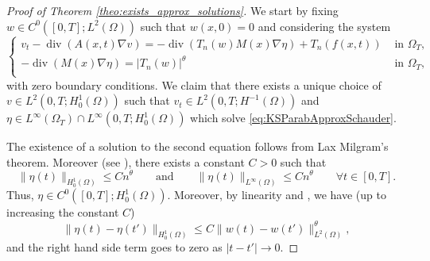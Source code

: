 \documentclass{amsart}
\numberwithin{equation}{section}
\def\elle#1{L^{#1}}
\def\elleom#1{L^{#1}(\Omega)}
\def\Hom{H^1_0(\Omega)}
\def\norma#1#2{ \|#1 \|_{#2}}
\newcommand{\abs}[1]{\left|#1\right|}
\begin{document}
\begin{proof}[Proof of Theorem \ref{theo:exists_approx_solutions}]
    We start by fixing $w\in C^0([0,T];\elleom2)$ such that $w(x,0)=0$ and considering the system
    \begin{equation}\label{eq:KSParabApproxSchauder}
        \left\{\begin{array}{cc}
            v_t-\operatorname{div}(A(x, t) \nabla v)=-\operatorname{div}(T_n(w) M(x) \nabla \eta)+T_n(f(x,t)) & \text { in } \Omega_T, \\
            -\operatorname{div}(M(x) \nabla \eta)=|T_n(w)|^\theta & \text { in } \Omega_T, \\
        \end{array}\right.
    \end{equation}
    with zero boundary conditions. We claim that there exists a unique choice of $v\in\elle2(0,T;\Hom)$ such that $v_t\in\elle2(0,T;H^{-1}(\Omega))$ and $\eta\in\elle\infty(\Omega_T)\cap\elle\infty(0,T;\Hom)$ which solve \eqref{eq:KSParabApproxSchauder}.
    
    The existence of a solution to the second equation follows from Lax Milgram's theorem. Moreover (see \cite[Th\'eor\`eme 4.1]{StampacchiaElliptic}), there exists a constant $C>0$ such that
    \begin{equation}
        \norma{\eta(t)}{\Hom}\leq C n^\theta\qquad\text{and}\qquad\norma{\eta(t)}{\elleom\infty}\leq C n^\theta\qquad \forall t\in [0,T].
    \end{equation}
    Thus, $\eta\in C^0([0,T];\Hom)$.
    Moreover, by linearity and \cite[Th\'eor\`eme 4.1]{StampacchiaElliptic}, we have (up to increasing the constant $C$)
    $$\norma{\eta(t)-\eta(t')}{\Hom}
    \leq
    C\norma{w(t)-w(t')}{\elleom2}^\theta,$$
    and the right hand side term goes to zero as $\abs{t-t'}\to 0$.


\end{proof}
\end{document}
